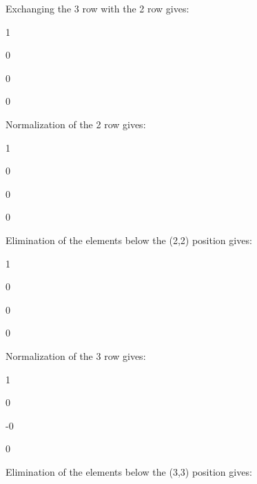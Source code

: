 \documentclass{article}
\begin{document}
Exchanging the 3 row with the 2 row gives:

1\qquad \TEXTsymbol{\vert}\qquad

0\qquad \TEXTsymbol{\vert}\qquad

0\qquad \TEXTsymbol{\vert}\qquad

0\qquad \TEXTsymbol{\vert}\qquad

Normalization of the 2 row gives:

1\qquad \TEXTsymbol{\vert}\qquad

0\qquad \TEXTsymbol{\vert}\qquad

0\qquad \TEXTsymbol{\vert}\qquad

0\qquad \TEXTsymbol{\vert}\qquad

Elimination of the elements below the (2,2) position gives:

1\qquad \TEXTsymbol{\vert}\qquad

0\qquad \TEXTsymbol{\vert}\qquad

0\qquad \TEXTsymbol{\vert}\qquad

0\qquad \TEXTsymbol{\vert}\qquad

Normalization of the 3 row gives:

1\qquad \TEXTsymbol{\vert}\qquad

0\qquad \TEXTsymbol{\vert}\qquad

-0\qquad \TEXTsymbol{\vert}\qquad

0\qquad \TEXTsymbol{\vert}\qquad

Elimination of the elements below the (3,3) position gives:
\end{document}
